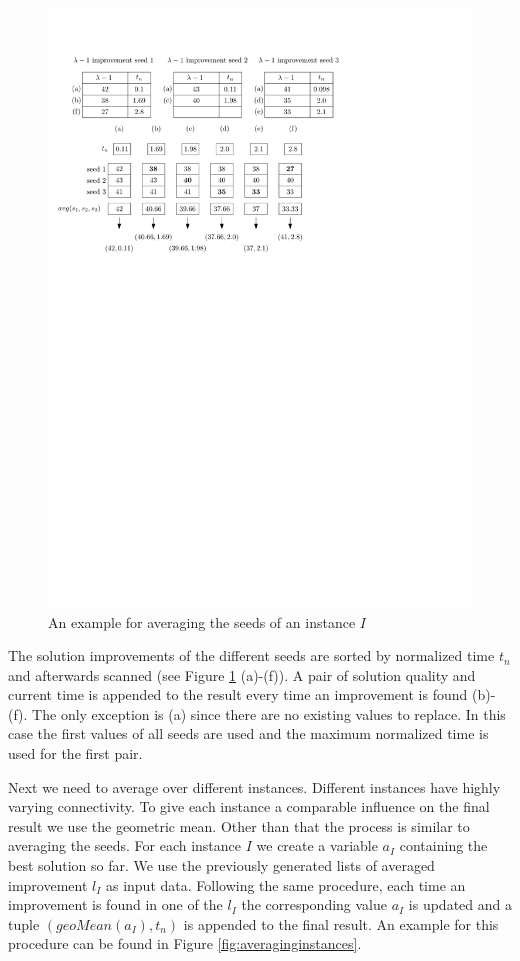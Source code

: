 \documentclass[a4paper,12pt,titlepage, BCOR7mm,headsepline]{scrbook}
\numberwithin{equation}{section}
\begin{document}
\begin{figure}[H] 
    
  \begin{center}
   \includegraphics[width=.9\textwidth]{Ipe/seed_averaging_example.pdf}
  \caption{An example for averaging the seeds of an instance $I$}\label{fig:averagingseeds} %
  \end{center}
    
\end{figure}
The solution improvements of the different seeds are sorted by normalized time $t_n$ and afterwards scanned (see Figure \ref{fig:averagingseeds} (a)-(f)). A pair of solution quality and current time is appended to the result every time an improvement is found (b)-(f). The only exception is (a) since there are no existing values to replace. In this case the first values of all seeds are used and the maximum normalized time is used for the first pair.


Next we need to average over different instances. Different instances have highly varying connectivity. To give each instance a comparable influence on the final result we use the geometric mean. Other than that the process is similar to averaging the seeds. For each instance $I$ we create a variable $a_I$ containing the best solution so far. We use the previously generated lists of averaged improvement $l_I$ as input data. Following the same procedure, each time an improvement is found in one of the $l_I$ the corresponding value $a_I$ is updated and a tuple $(geoMean(a_I), t_n)$ is appended to the final result. An example for this procedure can be found in Figure \ref{fig:averaginginstances}.
\end{document}
